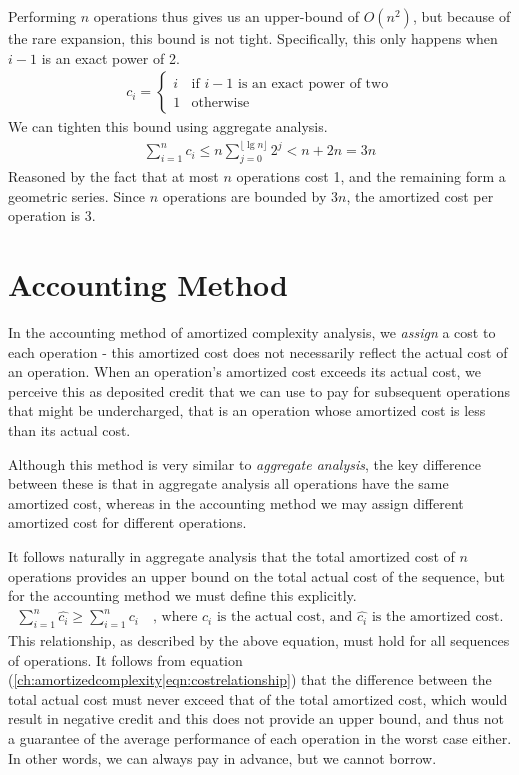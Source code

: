 Performing $n$ operations thus gives us an upper-bound of $O(n^2)$, but
because of the rare expansion, this bound is not tight. Specifically, this
only happens when $i - 1$ is an exact power of 2.
\begin{align}
	c_i =
	\begin{cases}
		i & \mbox{if $i - 1$ is an exact power of two} \\
		1 & \mbox{otherwise}
	\end{cases}
\end{align}
We can tighten this bound using aggregate analysis.
\begin{align}
	\sum_{i=1}^{n}c_i
	\leq n \sum_{j=0}^{\lfloor \lg n \rfloor} 2^j
	< n + 2n
	= 3n
\end{align}
Reasoned by the fact that at most $n$ operations cost 1, and the remaining
form a geometric series. Since $n$ operations are bounded by $3n$, the
amortized cost per operation is $3$.

\newpage
\section{Accounting Method}
In the accounting method of amortized complexity analysis, we \textit{assign}
a cost to each operation - this amortized cost does not necessarily reflect
the actual cost of an operation. When an operation's amortized cost exceeds
its actual cost, we perceive this as deposited credit that we can use to pay
for subsequent operations that might be undercharged, that is an operation
whose amortized cost is less than its actual cost.

Although this method is very similar to \textit{aggregate analysis}, the key
difference between these is that in aggregate analysis all operations have
the same amortized cost, whereas in the accounting method we may assign
different amortized cost for different operations.

It follows naturally in aggregate analysis that the total amortized cost of
$n$ operations provides an upper bound on the total actual cost of the
sequence, but for the accounting method we must define this explicitly.
\begin{align}
\label{ch:amortizedcomplexity|eqn:costrelationship}
	\sum_{i=1}^{n}{\hat{c_i}} \geq \sum_{i=1}^{n}{c_i}
	\quad \text{, where }c_i\text{ is the actual cost, and }
	\hat{c_i}\text{ is the amortized cost.}
\end{align}
This relationship, as described by the above equation, must hold for all
sequences of operations. It follows from equation
(\ref{ch:amortizedcomplexity|eqn:costrelationship}) that the difference
between the total actual cost must never exceed that of the total amortized
cost, which would result in negative credit and this does not provide an upper
bound, and thus not a guarantee of the average performance of each operation
in the worst case either. In other words, we can always pay in advance, but
we cannot borrow.

